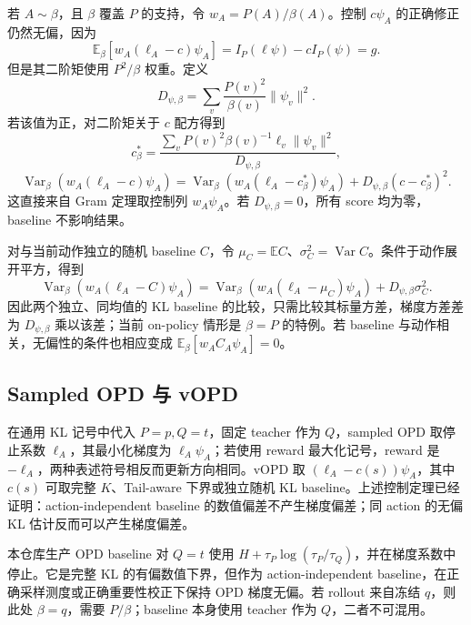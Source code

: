 \documentclass[lang=cn,scheme=chinese,openany]{../book/elegantbook}
\newcommand{\E}{\mathbb E}
\newcommand{\Var}{\operatorname{Var}}
\begin{document}
若 $A\sim\beta$，且 $\beta$ 覆盖 $P$ 的支持，令 $w_A=P(A)/\beta(A)$。控制 $c \psi_A$ 的正确修正仍然无偏，因为
\begin{equation*}
 \E_\beta[w_A(\ell_A-c)\psi_A]=I_P(\ell\psi)-cI_P(\psi)=g.
\end{equation*}
但是其二阶矩使用 $P^2/\beta$ 权重。定义
\begin{equation*}
 D_{\psi,\beta}=\sum_v\frac{P(v)^2}{\beta(v)}\|\psi_v\|^2.
\end{equation*}
若该值为正，对二阶矩关于 $c$ 配方得到
\begin{equation*}
 c_\beta^*=
 \frac{\sum_v P(v)^2\beta(v)^{-1}\ell_v\|\psi_v\|^2}{D_{\psi,\beta}},
\end{equation*}
\begin{equation*}
 \Var_\beta(w_A(\ell_A-c)\psi_A)
 =\Var_\beta(w_A(\ell_A-c_\beta^*)\psi_A)
  +D_{\psi,\beta}(c-c_\beta^*)^2.
\end{equation*}
这直接来自 Gram 定理取控制列 $w_A\psi_A$。若 $D_{\psi,\beta}=0$，所有 score 均为零，baseline 不影响结果。

对与当前动作独立的随机 baseline $C$，令 $\mu_C=\E C$、$\sigma_C^2=\Var C$。条件于动作展开平方，得到
\begin{equation*}
 \Var_\beta(w_A(\ell_A-C)\psi_A)
 =\Var_\beta(w_A(\ell_A-\mu_C)\psi_A)+D_{\psi,\beta}\sigma_C^2.
\end{equation*}
因此两个独立、同均值的 KL baseline 的比较，只需比较其标量方差，梯度方差差为 $D_{\psi,\beta}$ 乘以该差；当前 on-policy 情形是 $\beta=P$ 的特例。若 baseline 与动作相关，无偏性的条件也相应变成 $\E_\beta[w_AC_A\psi_A]=0$。

\subsection{Sampled OPD 与 vOPD}

在通用 KL 记号中代入 $P=p,Q=t$，固定 teacher 作为 $Q$，sampled OPD 取停止系数 $\ell_A$，其最小化梯度为 $\ell_A\psi_A$；若使用 reward 最大化记号，reward 是 $-\ell_A$，两种表述符号相反而更新方向相同。vOPD 取 $(\ell_A-c(s))\psi_A$，其中 $c(s)$ 可取完整 $K$、Tail-aware 下界或独立随机 KL baseline。上述控制定理已经证明：action-independent baseline 的数值偏差不产生梯度偏差；同 action 的无偏 KL 估计反而可以产生梯度偏差。

本仓库生产 OPD baseline 对 $Q=t$ 使用 $H+\tau_P\log(\tau_P/\tau_Q)$，并在梯度系数中停止。它是完整 KL 的有偏数值下界，但作为 action-independent baseline，在正确采样测度或正确重要性校正下保持 OPD 梯度无偏。若 rollout 来自冻结 $q$，则此处 $\beta=q$，需要 $P/\beta$；baseline 本身使用 teacher 作为 $Q$，二者不可混用。
\end{document}

